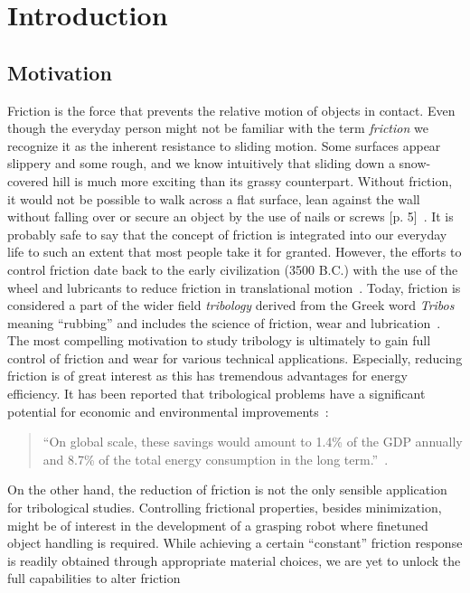 \chapter{Introduction}


\section{Motivation}
Friction is the force that prevents the relative motion of objects in contact. Even though the everyday person might not be familiar with the
term \textit{friction} we recognize it as the inherent resistance to sliding
motion. Some surfaces appear slippery and some rough, and we know intuitively
that sliding down a snow-covered hill is much more exciting than its grassy
counterpart. Without friction, it would not be possible to walk across a flat
surface, lean against the wall without falling over or secure an object by the
use of nails or screws [p. 5]~\cite{gnecco_meyer_2015}. It is probably safe to
say that the concept of friction is integrated into our everyday life to such an
extent that most people take it for granted. However, the efforts to control
friction date back to the early civilization (3500 B.C.) with the use of the
wheel and lubricants to reduce friction in translational motion~\cite{bhushan_2013}. Today, friction is considered a part of the wider field
\textit{tribology} derived from the Greek word \textit{Tribos} meaning
``rubbing'' and includes the science of friction, wear and lubrication~\cite{bhushan_2013}. The most compelling motivation to study tribology is
ultimately to gain full control of friction and wear for various technical
applications. Especially, reducing friction is of great interest as this has
tremendous advantages for energy efficiency. It has been reported that
tribological problems have a significant potential for economic and
environmental improvements~\cite{kim_nano-scale_2009}:
\begin{quote}
    ``On global scale, these savings would amount to 1.4\% of the GDP annually
    and 8.7\% of the total energy consumption in the long term.''~\cite{holmberg_influence_2017}. 
\end{quote}
On the other hand, the reduction of friction is not the only sensible
application for tribological studies. Controlling frictional properties, besides
minimization, might be of interest in the development of a grasping robot where
finetuned object handling is required. While achieving a certain ``constant''
friction response is readily obtained through appropriate material choices, we are yet to unlock the full capabilities to alter friction
